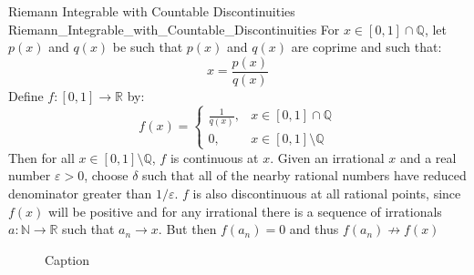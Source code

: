 \documentclass[crop=false,class=article]{standalone}                           %
\begin{document}
        \begin{lexample}
              {Riemann Integrable with Countable Discontinuities}
              {Riemann_Integrable_with_Countable_Discontinuities}
            For $x\in[0,1]\cap\mathbb{Q}$, let $p(x)$ and $q(x)$ be such
            that $p(x)$ and $q(x)$ are coprime and such that:
            \begin{equation}
                x=\frac{p(x)}{q(x)}
            \end{equation}
            Define $f:[0,1]\rightarrow\mathbb{R}$ by:
            \begin{equation}
                f(x)=
                \begin{cases}
                    \frac{1}{q(x)},&x\in[0,1]\cap\mathbb{Q}\\
                    0,&x\in[0,1]\setminus\mathbb{Q}
                \end{cases}
            \end{equation}
            Then for all $x\in[0,1]\setminus\mathbb{Q}$, $f$ is continuous
            at $x$. Given an irrational $x$ and a real number $\varepsilon>0$,
            choose $\delta$ such that all of the nearby rational numbers have
            reduced denominator greater than $1/\varepsilon$. $f$ is also
            discontinuous at all rational points, since $f(x)$ will be
            positive and for any irrational there is a sequence of
            irrationals $a:\mathbb{N}\rightarrow\mathbb{R}$ such that
            $a_{n}\rightarrow{x}$. But then $f(a_{n})=0$ and thus
            $f(a_{n})\not\rightarrow{f}(x)$
        \end{lexample}
        \begin{figure}[H]
            \centering
            \captionsetup{type=figure}
            
            \caption{Caption}
            \label{fig:my_label}
        \end{figure}
\end{document}
